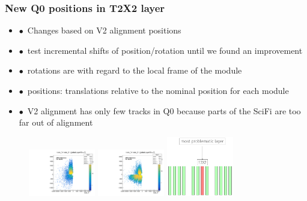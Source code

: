 \documentclass[aspectratio=1610, 12pt, xcolor=dvipsnames]{beamer}
\begin{document}
\begin{frame}\frametitle{New Q0 positions in T2X2 layer}
  \begin{itemize}
    \item $\bullet$\, Changes based on V2 alignment positions
    \item $\bullet$\, test incremental shifts of position/rotation until we found an improvement
    \item $\bullet$\, rotations are with regard to the local frame of the module
    \item $\bullet$\, positions: translations relative to the nominal position for each module
    \item $\bullet$\, V2 alignment has only few tracks in Q0 because parts of the SciFi are too far out of alignment
  \end{itemize}
  \begin{figure}
    \includegraphics[width=0.26\textwidth]{logos/2D_nodeXY_v2_7_left.pdf}%
    \includegraphics[width=0.26\textwidth]{logos/2D_nodeXY_quartermean_7_left.pdf}%
    \includegraphics[width=0.26\textwidth]{logos/bad_layer.png}%
  \end{figure}
\end{frame}
\end{document}
